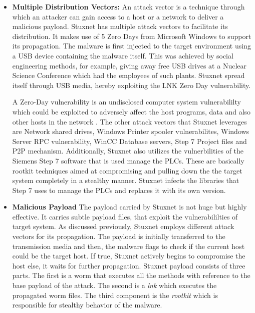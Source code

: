 \documentclass[article,msc=informatik,type=msc,colorback,accentcolor=tud9c]{tudthesis}
\begin{document}
	\begin{itemize}

	\item\textbf{Multiple Distribution Vectors:} An attack vector is a technique through which an attacker can gain access to a host or a network to deliver a malicious payload. Stuxnet has multiple attack vectors to facilitate its distribution. It makes use of 5 Zero Days from Microsoft Windows to support its propagation. The malware is first injected to the target environment using a USB device containing the malware itself. This was achieved by social engineering methods, for example, giving away free USB drives at a Nuclear Science Conference which had the employees of such plants. Stuxnet spread itself through USB media, hereby exploiting the LNK Zero Day vulnerability.
	
	\vspace{3mm}
	 A Zero-Day vulnerability is an undisclosed computer system vulnerabililty which could be exploited to adversely affect the host programs, data and also other hosts in the network . The other attack vectors that Stuxnet leverages~\cite{murchu2010stuxnet} are Network shared drives, Windows Printer spooler vulnerabilites,  Windows Server RPC vulnerability, \ac{WinCC} Database servers, Step 7 Project files and P2P mechanism. Additionally, Stuxnet also utilizes the vulnerbilities of the Siemens Step 7 software that is used manage the \ac{PLC}s. These are basically rootkit techniques aimed at compromising and pulling down the the target system completely in a stealthy manner.  Stuxnet infects the libraries that Step 7 uses to manage the \ac{PLC}s and replaces it with its own version. 

	\vspace{3mm}

	\item\textbf{Malicious Payload} The payload carried by Stuxnet is not huge but highly effective. It carries subtle payload files, that exploit the vulnerabililties of target system. As discussed previously, Stuxnet employs different attack vectors for its propagation. The payload is initially transferred to the transmission media and then, the malware flags to check if the current host could be the target host. If true, Stuxnet actively begins to compromise the host else, it waits for further propagation. Stuxnet payload consists of three parts. The first is a worm that executes all the methods with reference to the base payload of the attack. The second is a \textit{lnk} which executes the propagated worm files. The third component is the \textit{rootkit} which is responsible for stealthy behavior of the malware.   
	

\end{itemize}
\end{document}
